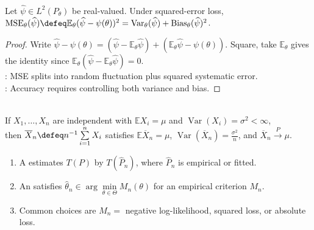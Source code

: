 \begin{proposition} \label{prop:mse-bias-variance-decomposition} \\
Let $\widehat{\psi}\in L^2(P_\theta)$ be real-valued. Under squared-error loss, $\operatorname{MSE}_\theta(\widehat{\psi})\defeq\mathbb{E}_\theta(\widehat{\psi}-\psi(\theta))^2=\operatorname{Var}_\theta(\widehat{\psi})+\operatorname{Bias}_\theta(\widehat{\psi})^2$.
\begin{proof} Write $\widehat{\psi}-\psi(\theta)=(\widehat{\psi}-\mathbb{E}_\theta\widehat{\psi})+(\mathbb{E}_\theta\widehat{\psi}-\psi(\theta))$. Square, take $\mathbb{E}_\theta$ gives the identity since $\mathbb{E}_\theta(\widehat{\psi}-\mathbb{E}_\theta\widehat{\psi})=0$.\\
: MSE splits into random fluctuation plus squared systematic error.\\
: Accuracy requires controlling both variance and bias.
\end{proof}
\end{proposition}

\begin{example} \label{ex:sample-mean-estimator} \\
If $X_1,\ldots,X_n$ are independent with $\mathbb{E}X_i=\mu$ and $\operatorname{Var}(X_i)=\sigma^2<\infty$,\\
then $\overline{X}_n\defeq n^{-1}\sum\limits_{i=1}^{n}X_i$ satisfies $\mathbb{E}\overline{X}_n=\mu$, $\operatorname{Var}(\overline{X}_n)=\frac{\sigma^2}{n}$, and $\overline{X}_n\xrightarrow{P}\mu$.
\end{example}

\begin{definition} \label{def:plug-in-estimator-and-m-estimator} 
\begin{enumerate}[label=(\roman*)]
\setlength{\itemsep}{0pt}
\item A  estimates $T(P)$ by $T(\widehat{P}_n)$, where $\widehat{P}_n$ is empirical or fitted.
\item An  satisfies $\widehat{\theta}_n\in\arg\min\limits_{\theta\in\Theta}M_n(\theta)$ for an empirical criterion $M_n$.
\item Common choices are $M_n=$ negative log-likelihood, squared loss, or absolute loss.
\end{enumerate}
\end{definition}

